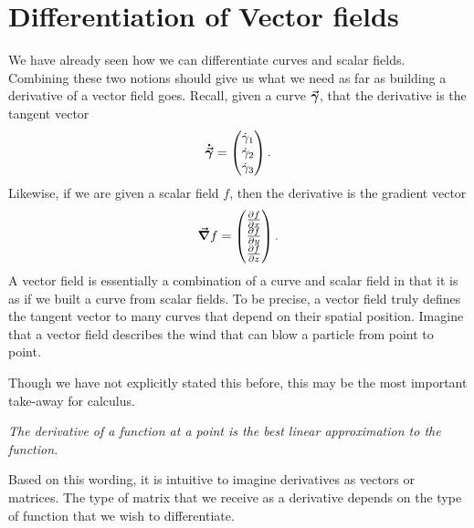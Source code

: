         
        
        \section{Differentiation of Vector fields}
        We have already seen how we can differentiate curves and scalar fields.  Combining these two notions should give us what we need as far as building a derivative of a vector field goes.  Recall, given a curve $\boldsymbol{\vec{\gamma}}$, that the derivative is the tangent vector
        \[
        \boldsymbol{\dot{\vec{\gamma}}} = \begin{pmatrix} \dot{\gamma}_1 \\ \dot{\gamma}_2 \\ \dot{\gamma}_3 \end{pmatrix}.
        \]
        Likewise, if we are given a scalar field $f$, then the derivative is the gradient vector
        \[
        \boldsymbol{\vec{\nabla}} f = \begin{pmatrix} \frac{\partial f}{\partial x} \\ \frac{\partial f}{\partial y} \\ \frac{\partial f}{\partial z} \end{pmatrix}.
        \]
        A vector field is essentially a combination of a curve and scalar field in that it is as if we built a curve from scalar fields.  To be precise, a vector field truly defines the tangent vector to many curves that depend on their spatial position.  Imagine that a vector field describes the wind that can blow a particle from point to point.
       
        
        \begin{remark}
        Though we have not explicitly stated this before, this may be the most important take-away for calculus.
        
        \emph{The derivative of a function at a point is the best linear approximation to the function.} 
        
        Based on this wording, it is intuitive to imagine derivatives as vectors or matrices. The type of matrix that we receive as a derivative depends on the type of function that we wish to differentiate.  
        \end{remark}
        
